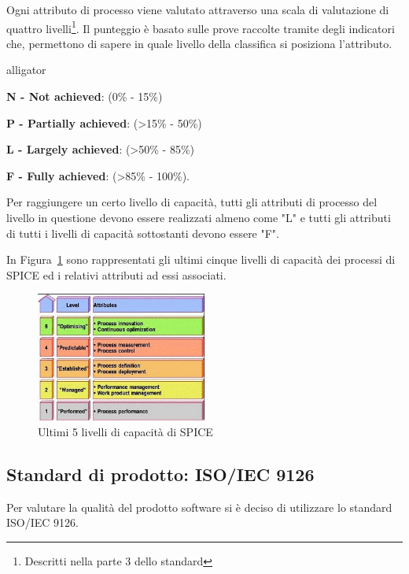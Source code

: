 Ogni attributo di processo viene valutato attraverso una scala di valutazione di quattro livelli\footnote{Descritti nella parte 3 dello standard}. Il punteggio è basato sulle prove raccolte tramite degli indicatori che, permettono di sapere in quale livello della classifica si posiziona l'attributo. 
\begin{labeling}{alligator}
	\item \textbf{N - Not achieved}: (0\% - 15\%)
	\item \textbf{P - Partially achieved}: (>15\% - 50\%)
	\item \textbf{L - Largely achieved}: (>50\% - 85\%)
	\item \textbf{F - Fully achieved}: (>85\% - 100\%).
\end{labeling}

Per raggiungere un certo livello di capacità, tutti gli attributi di processo del livello in questione devono essere realizzati almeno come "L" e tutti gli attributi di tutti i livelli di capacità sottostanti devono essere "F".

In Figura~\ref{fig:liv_cap_spice} sono rappresentati gli ultimi cinque livelli di capacità dei processi di SPICE ed i relativi attributi ad essi associati.

\begin{figure}[h!]
	\centering
	\includegraphics[width=0.50\textwidth]{img/liv_cap_spice.jpg}
	\caption{Ultimi 5 livelli di capacità di SPICE}
	\label{fig:liv_cap_spice}
\end{figure}


\subsection{Standard di prodotto: ISO/IEC 9126}
\label{AppA:standardProd}
Per valutare la qualità del prodotto software si è deciso di utilizzare lo standard ISO/IEC 9126.


